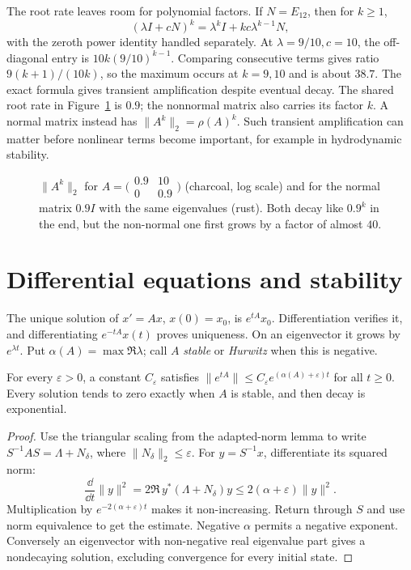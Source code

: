 The root rate leaves room for polynomial factors. If $N=E_{12}$, then for $k\ge1$,
\[(\lambda I+cN)^k=\lambda^kI+kc\lambda^{k-1}N,\]
with the zeroth power identity handled separately. At $\lambda=9/10,c=10$, the off-diagonal entry is $10k(9/10)^{k-1}$. Comparing consecutive terms gives ratio $9(k+1)/(10k)$, so the maximum occurs at $k=9,10$ and is about $38.7$. The exact formula gives transient amplification despite eventual decay. The shared root rate in Figure~\ref{linear:fig:transient} is $0.9$; the nonnormal matrix also carries its factor $k$. A normal matrix instead has $\|A^k\|_2=\rho(A)^k$. Such transient amplification can matter before nonlinear terms become important, for example in hydrodynamic stability.

\begin{figure}[ht]
\centering
{}
\caption{$\|A^k\|_2$ for $A=\bigl(\begin{smallmatrix}0.9&10\\0&0.9\end{smallmatrix}\bigr)$ (charcoal, log scale) and for the normal matrix
$0.9I$ with the same eigenvalues (rust). Both decay like $0.9^k$ in the end, but the non-normal one first grows by a factor of almost
$40$.}
\label{linear:fig:transient}
\end{figure}

\section{Differential equations and stability}

The unique solution of $x'=Ax$, $x(0)=x_0$, is $e^{tA}x_0$. Differentiation verifies it, and differentiating $e^{-tA}x(t)$ proves uniqueness. On an eigenvector it grows by $e^{\lambda t}$. Put $\alpha(A)=\max\Re\lambda$; call $A$ \emph{stable} or \emph{Hurwitz} when this is negative.

\begin{theorem}[stability]\label{linear:thm:stability}
For every $\varepsilon>0$, a constant $C_\varepsilon$ satisfies $\|e^{tA}\|\le C_\varepsilon e^{(\alpha(A)+\varepsilon)t}$ for all $t\ge0$. Every solution tends to zero exactly when $A$ is stable, and then decay is exponential.
\end{theorem}
\begin{proof}
Use the triangular scaling from the adapted-norm lemma to write $S^{-1}AS=\Lambda+N_\delta$, where $\|N_\delta\|_2\le\varepsilon$. For $y=S^{-1}x$, differentiate its squared norm:
\[\frac{\dd}{\dd t}\|y\|^2=2\Re\,y^*(\Lambda+N_\delta)y\le2(\alpha+\varepsilon)\|y\|^2.
\]
Multiplication by $e^{-2(\alpha+\varepsilon)t}$ makes it non-increasing. Return through $S$ and use norm equivalence to get the estimate. Negative $\alpha$ permits a negative exponent. Conversely an eigenvector with non-negative real eigenvalue part gives a nondecaying solution, excluding convergence for every initial state.
\end{proof}

